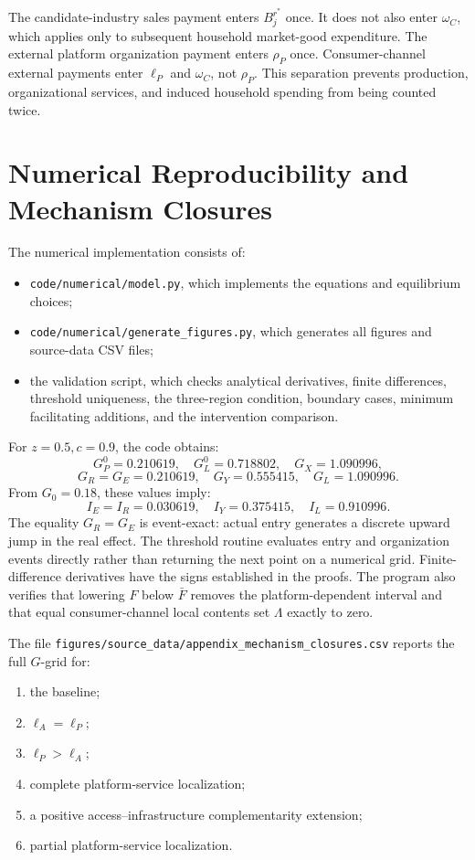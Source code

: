 The candidate-industry sales payment enters \(B_j^{r^*}\) once.  It does not
also enter \(\omega_C\), which applies only to subsequent household
market-good expenditure.  The external platform organization payment enters
\(\rho_P\) once.  Consumer-channel external payments enter \(\ell_P\) and
\(\omega_C\), not \(\rho_P\).  This separation prevents production,
organizational services, and induced household spending from being counted
twice.

\section{Numerical Reproducibility and Mechanism Closures}

The numerical implementation consists of:
\begin{itemize}
 \item \texttt{code/numerical/model.py}, which implements the equations and
 equilibrium choices;
 \item \texttt{code/numerical/generate\_figures.py}, which generates all
 figures and source-data CSV files;
 \item the validation script, which checks analytical derivatives, finite
 differences, threshold uniqueness, the three-region condition, boundary
 cases, minimum facilitating additions, and the intervention comparison.
\end{itemize}

For \(z=0.5,c=0.9\), the code obtains:
\[
G_P^0=0.210619,\quad
G_L^0=0.718802,\quad
G_X=1.090996,
\]
\[
G_R=G_E=0.210619,\quad
G_Y=0.555415,\quad
G_L=1.090996.
\]
From \(G_0=0.18\), these values imply:
\[
I_E=I_R=0.030619,\quad
I_Y=0.375415,\quad
I_L=0.910996.
\]
The equality \(G_R=G_E\) is event-exact: actual entry generates a discrete
upward jump in the real effect.  The threshold routine evaluates entry and
organization events directly rather than returning the next point on a
numerical grid.  Finite-difference derivatives have the signs established in
the proofs.
The program also verifies that lowering \(F\) below \(\bar F\) removes the
platform-dependent interval and that equal consumer-channel local contents
set \(\Lambda\) exactly to zero.

The file
\texttt{figures/source\_data/appendix\_mechanism\_closures.csv}
reports the full \(G\)-grid for:
\begin{enumerate}
 \item the baseline;
 \item \(\ell_A=\ell_P\);
 \item \(\ell_P>\ell_A\);
 \item complete platform-service localization;
 \item a positive access--infrastructure complementarity extension;
 \item partial platform-service localization.
\end{enumerate}

